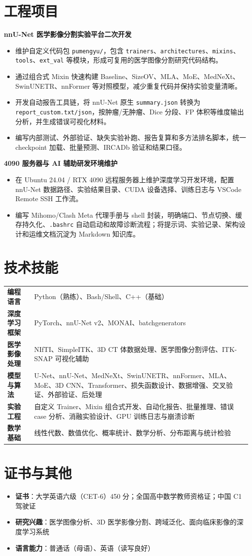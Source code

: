 \documentclass[10pt,a4paper]{ctexart}
\newcommand{\role}[2]{
  \textbf{#1} \hfill #2
}
\begin{document}
\section{工程项目}
\role{nnU-Net 医学影像分割实验平台二次开发}{}
\begin{itemize}
  \item 维护自定义代码包 \texttt{pumengyu/}，包含 \texttt{trainers}、\texttt{architectures}、\texttt{mixins}、\texttt{tools}、\texttt{ext\_val} 等模块，形成可复用的医学图像分割研究代码结构。
  \item 通过组合式 Mixin 快速构建 Baseline、SizeOV、MLA、MoE、MedNeXt、SwinUNETR、nnFormer 等对照模型，减少重复代码并保持实验变量清晰。
  \item 开发自动报告工具链，将 nnU-Net 原生 \texttt{summary.json} 转换为 \texttt{report\_custom.txt/json}，按肿瘤/无肿瘤、Dice 分段、FP 体积等维度输出分析，并生成错误可视化材料。
  \item 编写内部测试、外部验证、缺失实验补跑、报告复算和多方法排名脚本，统一 checkpoint 加载、批量预测、IRCADb 验证和结果口径。
\end{itemize}

\role{4090 服务器与 AI 辅助研发环境维护}{}
\begin{itemize}
  \item 在 Ubuntu 24.04 / RTX 4090 远程服务器上维护深度学习开发环境，配置 nnU-Net 数据路径、实验结果目录、CUDA 设备选择、训练日志与 VSCode Remote SSH 工作流。
  \item 编写 Mihomo/Clash Meta 代理手册与 shell 封装，明确端口、节点切换、缓存持久化、\texttt{.bashrc} 自动启动和故障诊断流程；将提示词、实验记录、架构设计和运维文档沉淀为 Markdown 知识库。
\end{itemize}

\section{技术技能}
\begin{tabularx}{\textwidth}{@{}lX@{}}
\textbf{编程语言} & Python（熟练）、Bash/Shell、C++（基础） \\
\textbf{深度学习框架} & PyTorch、nnU-Net v2、MONAI、batchgenerators \\
\textbf{医学影像处理} & NIfTI、SimpleITK、3D CT 体数据处理、医学图像分割评估、ITK-SNAP 可视化辅助 \\
\textbf{模型与算法} & U-Net、nnU-Net、MedNeXt、SwinUNETR、nnFormer、MLA、MoE、3D CNN、Transformer、损失函数设计、数据增强、交叉验证、外部验证、后处理 \\
\textbf{实验工程} & 自定义 Trainer、Mixin 组合式开发、自动化报告、批量推理、错误 case 分析、消融实验设计、GPU 训练日志与崩溃诊断 \\
\textbf{数学基础} & 线性代数、数值优化、概率统计、数学分析、分布距离与统计检验 \\
\end{tabularx}

\section{证书与其他}
\begin{itemize}
  \item \textbf{证书}：大学英语六级（CET-6）450 分；全国高中数学教师资格证；中国 C1 驾驶证
  \item \textbf{研究兴趣}：医学图像分析、3D 医学影像分割、跨域泛化、面向临床影像的深度学习系统
  \item \textbf{语言能力}：普通话（母语）、英语（读写良好）
\end{itemize}
\end{document}
